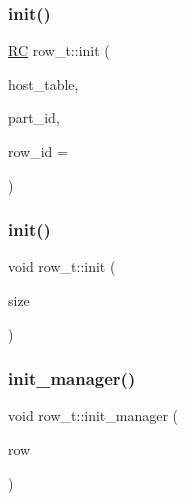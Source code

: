 \mbox{\label{classrow__t_aacb35baa21609238d8596a79228639f0}} 
\subsubsection{\texorpdfstring{init()}{init()}\hspace{0.1cm}{\footnotesize\ttfamily [1/2]}}
{\footnotesize\ttfamily \hyperlink{global_8h_a78c49a674c810fdd03d20432f7be864a}{RC} row\+\_\+t\+::init (\begin{DoxyParamCaption}\item[{\hyperlink{classtable__t}{table\+\_\+t} $\ast$}]{host\+\_\+table,  }\item[{uint64\+\_\+t}]{part\+\_\+id,  }\item[{uint64\+\_\+t}]{row\+\_\+id = {} }\end{DoxyParamCaption})}

\mbox{\label{classrow__t_ad3c8dd1b6ec42ab9bcb55bdae25bfe48}} 
\subsubsection{\texorpdfstring{init()}{init()}\hspace{0.1cm}{\footnotesize\ttfamily [2/2]}}
{\footnotesize\ttfamily void row\+\_\+t\+::init (\begin{DoxyParamCaption}\item[{int}]{size }\end{DoxyParamCaption})}

\mbox{\label{classrow__t_abce8cf60a90cccfdc5ecee7eeb005806}} 
\subsubsection{\texorpdfstring{init\+\_\+manager()}{init\_manager()}}
{\footnotesize\ttfamily void row\+\_\+t\+::init\+\_\+manager (\begin{DoxyParamCaption}\item[{\hyperlink{classrow__t}{row\+\_\+t} $\ast$}]{row }\end{DoxyParamCaption})}


